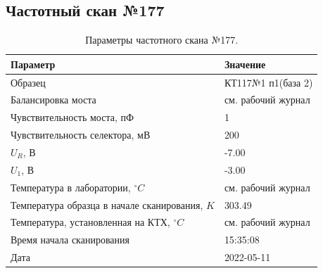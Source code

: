 \subsection{Частотный скан №177}
\begin{table}[!ht]
    \centering
    \caption{Параметры частотного скана №177.}
    \begin{tabular}{|l|l|}
        \hline
        Параметр                                       & Значение                  \\ \hline
        Образец                                        & КТ117№1 п1(база 2)        \\ \hline
        Балансировка моста                             & см. рабочий журнал        \\ \hline
        Чувствительность моста, пФ                     & 1                         \\ \hline
        Чувствительность селектора, мВ                 & 200                       \\ \hline
        $U_R$, В                                       & -7.00                     \\ \hline
        $U_1$, В                                       & -3.00                     \\ \hline
        Температура в лаборатории, $^\circ C$          & см. рабочий журнал        \\ \hline
        Температура образца в начале сканирования, $K$ & 303.49                    \\ \hline
        Температура, установленная на КТХ, $^\circ C$  & см. рабочий журнал        \\ \hline
        Время начала сканирования                      & 15:35:08                  \\ \hline
        Дата                                           & 2022-05-11                \\ \hline
    \end{tabular}
    \label{table:frequency_scan_177}
\end{table}

